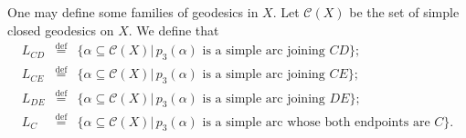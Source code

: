 \documentclass[UTF8]{amsart}
\numberwithin{equation}{section}
\theoremstyle{definition}
\theoremstyle{example}
\theoremstyle{remark}
\begin{document}
One may define some families of geodesics in $X$. Let $\mathcal{C}(X)$ be the set of simple closed geodesics on $X$. We define that
\begin{eqnarray*}
 L_{CD} &\overset{\mathrm{def}}{=} & \{ \alpha \subseteq \mathcal{C}(X) | \,p_3(\alpha) \text{ is a simple arc joining } CD \}; \\
 L_{CE} &\overset{\mathrm{def}}{=} & \{ \alpha \subseteq \mathcal{C}(X) | \,p_3(\alpha) \text{ is a simple arc joining } CE \}; \\
 L_{DE} &\overset{\mathrm{def}}{=} & \{ \alpha \subseteq \mathcal{C}(X) | \,p_3(\alpha) \text{ is a simple arc joining } DE \}; \\
 L_{C} &\overset{\mathrm{def}}{=} & \{ \alpha \subseteq \mathcal{C}(X) | \,p_3(\alpha) \text{ is a simple arc whose both endpoints are } C \}. 
\end{eqnarray*}
\end{document}
